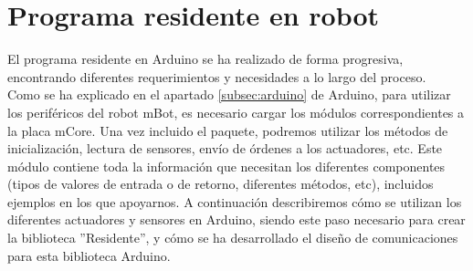 \section{Programa residente en robot}\label{sec:residente}
El programa residente en Arduino se ha realizado de forma progresiva, encontrando diferentes requerimientos y necesidades a lo largo del proceso. \\

Como se ha explicado en el apartado \ref{subsec:arduino} de Arduino, para utilizar los periféricos del robot mBot, es necesario cargar los módulos correspondientes a la placa mCore. Una vez incluido el paquete, podremos utilizar los métodos de inicialización, lectura de sensores, envío de órdenes a los actuadores, etc. Este módulo contiene toda la información que necesitan los diferentes componentes (tipos de valores de entrada o de retorno, diferentes métodos, etc), incluidos ejemplos en los que apoyarnos. A continuación describiremos cómo se utilizan los diferentes actuadores y sensores en Arduino, siendo este paso necesario para crear la biblioteca ''Residente'', y cómo se ha desarrollado el diseño de comunicaciones para esta biblioteca Arduino.

